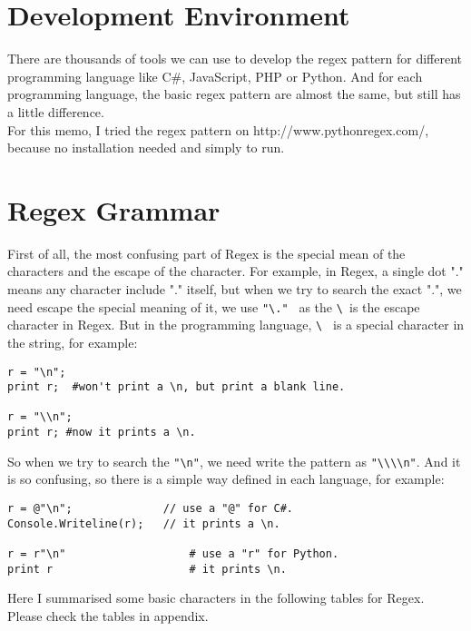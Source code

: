 \documentclass{article}
\begin{document}
\section{Development Environment}

There are thousands of tools we can use to develop the regex pattern for different programming language like C\#, JavaScript, PHP or Python. And for each programming language, the basic regex pattern are almost the same, but still has a little difference. \\
For this memo, I tried the regex pattern on http://www.pythonregex.com/, because no installation needed and simply to run.

\section{Regex Grammar}

First of all, the most confusing part of Regex is the special mean of the characters and the escape of the character. For example, in Regex, a single dot "." means any character include "." itself, but when we try to search the exact ".", we need escape the special meaning of it, we use \verb/"\." / as the \verb/\ /is the escape character in Regex. But in the programming language, \verb/\ / is a special character in the string, for example:

\begin{lstlisting}
r = "\n";
print r;  #won't print a \n, but print a blank line.

r = "\\n";
print r; #now it prints a \n.
\end{lstlisting} 

So when we try to search the \verb/"\n"/, we need write the pattern as \verb/"\\\\n"/. And
it is so confusing, so there is a simple way defined in each language, for example:

\begin{lstlisting}
r = @"\n"; 				// use a "@" for C#.
Console.Writeline(r);	// it prints a \n.

r = r"\n"					# use a "r" for Python. 
print r						# it prints \n.
\end{lstlisting}

Here I summarised some basic characters in the following tables for Regex.\\
Please check the tables in appendix.
\end{document}
